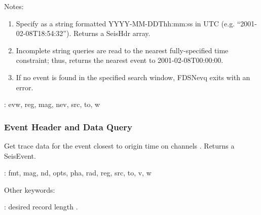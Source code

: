 \documentclass[letterpaper,11pt,english]{sphinxmanual}
\begin{document}
Notes:
\begin{enumerate}
\def\theenumi{\arabic{enumi}}
\def\labelenumi{\theenumi .}
\makeatletter\def\p@enumii{\p@enumi \theenumi .}\makeatother
\item {} 
Specify  as a string formatted YYYY-MM-DDThh:mm:ss in UTC (e.g. “2001-02-08T18:54:32”). Returns a SeisHdr array.

\item {} 
Incomplete string queries are read to the nearest fully-specified time constraint; thus,  returns the nearest event to 2001-02-08T00:00:00.

\item {} 
If no event is found in the specified search window, FDSNevq exits with an error.

\end{enumerate}

\begin{DUlineblock}{0em}
\item[] {\hyperref[\detokenize{src/Appendices/keywords:dkw}]{}}: evw, reg, mag, nev, src, to, w
\end{DUlineblock}


\subsubsection{Event Header and Data Query}
\label{\detokenize{src/Submodules/quake:event-header-and-data-query}}

\begin{fulllineitems}
\label{\detokenize{src/Submodules/quake:FDSNevt}}
\end{fulllineitems}


Get trace data for the event closest to origin time  on channels .
Returns a SeisEvent.

\begin{DUlineblock}{0em}
\item[] {\hyperref[\detokenize{src/Appendices/keywords:dkw}]{}}: fmt, mag, nd, opts, pha, rad, reg, src, to, v, w
\item[] Other keywords:
\item[] : desired record length .
\end{DUlineblock}
\end{document}

